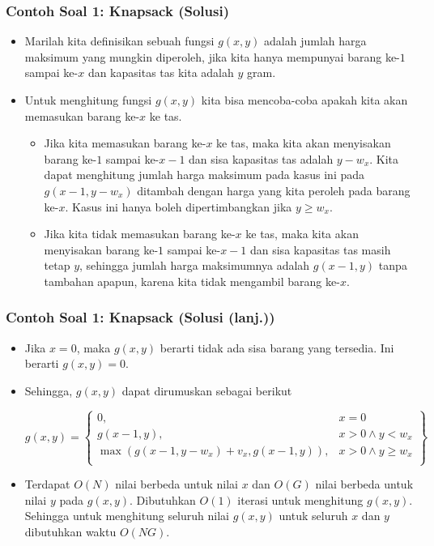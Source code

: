 \begin{frame} 
\frametitle{Contoh Soal 1: Knapsack (Solusi)}
\begin{itemize}
  \item Marilah kita definisikan sebuah fungsi $g(x,y)$ adalah jumlah harga maksimum yang mungkin diperoleh, jika kita hanya mempunyai barang ke-$1$ sampai ke-$x$ dan kapasitas tas kita adalah $y$ gram.
  \item Untuk menghitung fungsi $g(x,y)$ kita bisa mencoba-coba apakah kita akan memasukan barang ke-$x$ ke tas.
  \begin{itemize}
  \item Jika kita memasukan barang ke-$x$ ke tas, maka kita akan menyisakan barang ke-$1$ sampai ke-$x-1$ dan sisa kapasitas tas adalah $y-w_x$. Kita dapat menghitung jumlah harga maksimum pada kasus ini pada $g(x-1,y-w_x)$ ditambah dengan harga yang kita peroleh pada barang ke-$x$. Kasus ini hanya boleh dipertimbangkan jika $y \geq w_x$.
  \item Jika kita tidak memasukan barang ke-$x$ ke tas, maka kita akan menyisakan barang ke-$1$ sampai ke-$x-1$ dan sisa kapasitas tas masih tetap $y$, sehingga jumlah harga maksimumnya adalah $g(x-1,y)$ tanpa tambahan apapun, karena kita tidak mengambil barang ke-$x$.
  \end{itemize}
\end{itemize}
\end{frame}

\begin{frame} 
\frametitle{Contoh Soal 1: Knapsack (Solusi (lanj.))}
\begin{itemize}
  \item Jika $x=0$, maka $g(x,y)$ berarti tidak ada sisa barang yang tersedia. Ini berarti $g(x,y) = 0$.
  \item Sehingga, $g(x,y)$ dapat dirumuskan sebagai berikut
  \begin{small}
  \[g(x,y) = \left\{\begin{array}{lr}
        0, & x = 0\\
        g(x-1,y), & x > 0 \wedge y < w_x\\
        \max(g(x-1,y-w_x)+v_x,g(x-1,y)), & x > 0 \wedge y \geq w_x\\
        \end{array}\right\}\]
  \end{small}
  \item Terdapat $O(N)$ nilai berbeda untuk nilai $x$ dan $O(G)$ nilai berbeda untuk nilai $y$ pada $g(x,y)$. Dibutuhkan $O(1)$ iterasi untuk menghitung $g(x,y)$. Sehingga untuk menghitung seluruh nilai $g(x,y)$ untuk seluruh $x$ dan $y$ dibutuhkan waktu $O(NG)$.
\end{itemize}
\end{frame}


